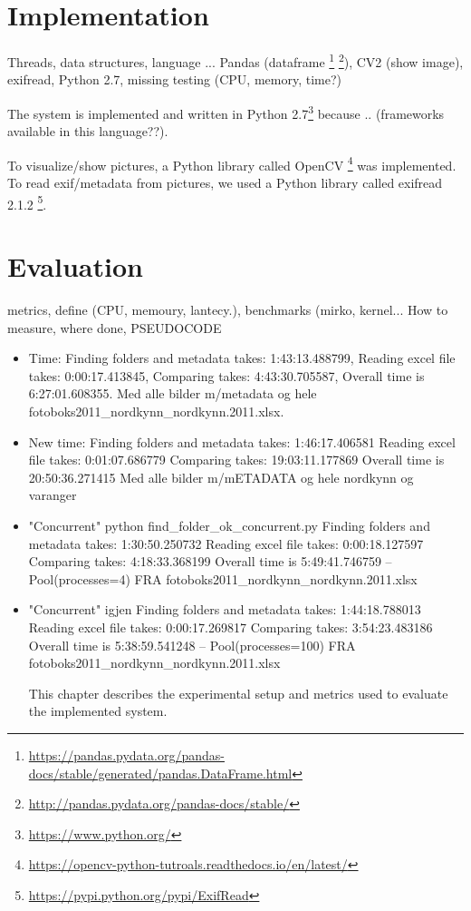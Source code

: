 \documentclass[USenglish]{uit-thesis}
\begin{document}
\fi

\chapter{Implementation}
Threads, data structures, language ...
Pandas (dataframe \footnote{\url{https://pandas.pydata.org/pandas-docs/stable/generated/pandas.DataFrame.html}} \footnote{\url{http://pandas.pydata.org/pandas-docs/stable/}}), CV2 (show image), exifread, Python 2.7, missing testing (CPU, memory, time?)


The system is implemented and written in Python 2.7\footnote{\url{https://www.python.org/}} because .. (frameworks available in this language??).

To visualize/show pictures, a Python library called OpenCV \footnote{\url{https://opencv-python-tutroals.readthedocs.io/en/latest/}} was implemented.
To read exif/metadata from pictures, we used a Python library called exifread 2.1.2 \footnote{\url{https://pypi.python.org/pypi/ExifRead}}.

\chapter{Evaluation} 
metrics, define (CPU, memoury, lantecy.), benchmarks (mirko, kernel...
How to measure, where done, PSEUDOCODE

\begin{itemize}
\item Time: Finding folders and metadata takes:  1:43:13.488799,
Reading excel file takes:  0:00:17.413845,
Comparing takes:  4:43:30.705587,
Overall time is  6:27:01.608355.
Med alle bilder m/metadata og hele fotoboks2011\_nordkynn\_nordkynn.2011.xlsx.

\item New time: Finding folders and metadata takes:  1:46:17.406581
Reading excel file takes:  0:01:07.686779
Comparing takes:  19:03:11.177869
Overall time is  20:50:36.271415
Med alle bilder m/mETADATA og hele nordkynn og varanger

\item "Concurrent" python find\_folder\_ok\_concurrent.py 
Finding folders and metadata takes:  1:30:50.250732
Reading excel file takes:  0:00:18.127597
Comparing takes:  4:18:33.368199
Overall time is  5:49:41.746759
-- Pool(processes=4)
FRA fotoboks2011\_nordkynn\_nordkynn.2011.xlsx

\item "Concurrent" igjen
Finding folders and metadata takes:  1:44:18.788013
Reading excel file takes:  0:00:17.269817
Comparing takes:  3:54:23.483186
Overall time is  5:38:59.541248
-- Pool(processes=100)
FRA fotoboks2011\_nordkynn\_nordkynn.2011.xlsx

This chapter describes the experimental setup and metrics used to evaluate the implemented system. 

\end{itemize}
\end{document}
